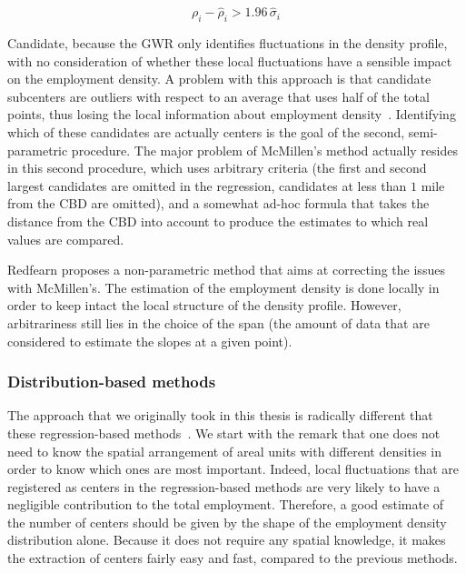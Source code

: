 \begin{equation}
    \rho_i - \hat{\rho}_i > 1.96\,\hat{\sigma}_i
\end{equation}

Candidate, because the GWR only identifies fluctuations in the density profile,
with no consideration of whether these local fluctuations have a sensible impact
on the employment density. A problem with this approach is that candidate
subcenters are outliers with respect to an average that uses half of the total
points, thus losing the local information about employment
density~\cite{Redfearn:2007}.
Identifying which of these candidates are actually
centers is the goal of the second, semi-parametric procedure. The major problem
of McMillen's method actually resides in this second procedure, which uses
arbitrary criteria (the first and second largest candidates are omitted in the
regression, candidates at less than $1$ mile from the CBD are omitted), and a
somewhat ad-hoc formula that takes the distance from the CBD into account to
produce the estimates to which real values are compared.

Redfearn proposes a non-parametric method that aims at correcting the issues
with McMillen's\cite{Redfearn:2007}. The estimation of the employment density is
done locally in order to keep intact the local structure of the density profile.
However, arbitrariness still lies in the choice of the span (the amount of data
that are considered to estimate the slopes at a given point).\\

\subsubsection{Distribution-based methods}
\label{ssub:distribution_based_methods}



The approach that we originally took in this thesis is radically different that
these regression-based methods~\cite{Louf:2013_polycentric}. We start with the
remark that one does not need to know the spatial arrangement of areal units
with different densities in order to know which ones are most important. Indeed,
local fluctuations that are registered as centers in the regression-based
methods are very likely to have a negligible contribution to the total
employment. Therefore, a good estimate of the number of centers should be given
by the shape of the employment density distribution alone. Because it does not
require any spatial knowledge, it makes the extraction of centers fairly easy
and fast, compared to the previous methods.\\


